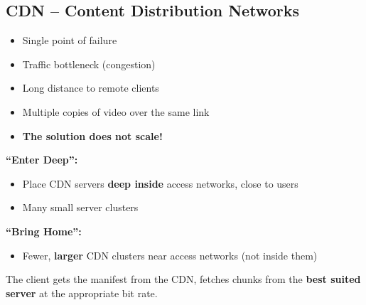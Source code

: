 \begin{imagebox}
\end{imagebox}

\subsection{CDN -- Content Distribution Networks}

\begin{warnbox}
\begin{itemize}[noitemsep]
    \item Single point of failure
    \item Traffic bottleneck (congestion)
    \item Long distance to remote clients
    \item Multiple copies of video over the same link
    \item \textbf{The solution does not scale!}
\end{itemize}
\end{warnbox}

\begin{keybox}
\textbf{``Enter Deep'':}
\begin{itemize}[noitemsep]
    \item Place CDN servers \textbf{deep inside} access networks, close to users
    \item Many small server clusters
\end{itemize}

\textbf{``Bring Home'':}
\begin{itemize}[noitemsep]
    \item Fewer, \textbf{larger} CDN clusters near access networks (not inside them)
\end{itemize}

The client gets the manifest from the CDN, fetches chunks from the \textbf{best suited server} at the appropriate bit rate.
\end{keybox}


